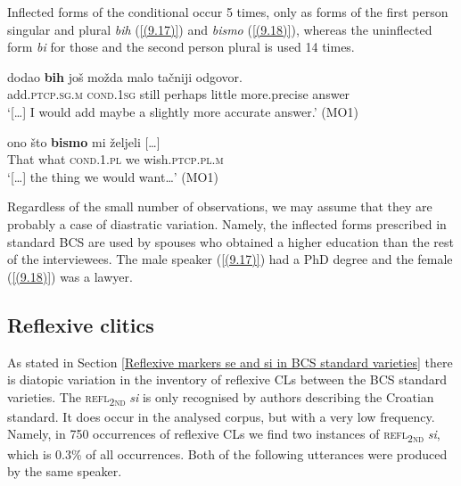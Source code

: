 
\noindent Inflected forms of the conditional occur 5 times, only as forms of the first person singular and plural \textit{bih} (\ref{(9.17)}) and \textit{bismo} (\ref{(9.18)}), whereas the uninflected form \textit{bi} for those and the second person plural is used 14 times.

\begin{exe}\ex\label{(9.17)}
\gll  [\dots] dodao \textbf{bih} još možda malo tačniji odgovor.  \\
{} add.\textsc{ptcp}.\textsc{sg}.\textsc{m} \textsc{cond}.1\textsc{sg} still perhaps little more.precise answer \\
\glt ‘[\dots] I would add maybe a slightly more accurate answer.’
\hfill  (MO1)

\ex\label{(9.18)}
\gll  [\dots] ono što \textbf{bismo} mi {željeli [\dots]} \\
      {} That what \textsc{cond}.1.\textsc{pl} we wish.\textsc{ptcp}.\textsc{pl}.\textsc{m} \\
\glt ‘[\dots] the thing we would want…’
\hfill  (MO1)
\end{exe}

\noindent Regardless of the small number of observations, we may assume that they are probably a case of diastratic variation. Namely, the inflected forms prescribed in standard BCS are used by spouses who obtained a higher education than the rest of the interviewees. The male speaker (\ref{(9.17)}) had a PhD degree and the female (\ref{(9.18)}) was a lawyer.

\subsection{Reflexive clitics}
\label{Reflexive clitics:9}

As stated in Section \ref{Reflexive markers se and si in BCS standard varieties} there is diatopic variation in the inventory of reflexive CLs between the BCS standard varieties. The \textsc{refl\textsubscript{2nd}} \textit{si} is only recognised by authors describing the Croatian standard. It does occur in the analysed corpus, but with a very low frequency. Namely, in 750 occurrences of reflexive CLs we find two instances of \textsc{refl\textsubscript{2nd}} \textit{si}, which is 0.3\% of all occurrences. Both of the following utterances were produced by the same speaker. 

